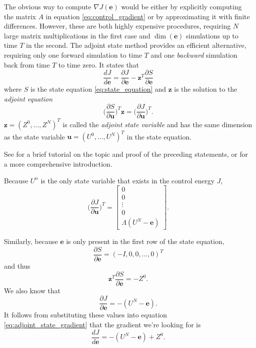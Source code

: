 \documentclass[utf8,english]{gradu3}
\begin{document}
The obvious way to compute $\nabla J(\mathbf{e})$ would be either by
explicitly computing the matrix $A$ in equation \eqref{eq:control_gradient}
or by approximating it with finite differences.
However, these are both highly expensive procedures,
requiring $N$ large matrix multiplications in the first case
and $\dim(\mathbf{e})$ simulations up to time $T$ in the second.
The adjoint state method provides an efficient alternative,
requiring only one forward simulation to time $T$
and one \textit{backward} simulation back from time $T$ to time zero.
It states that
\begin{equation}\label{eq:adjoint_state_gradient}
  \frac{dJ}{d\mathbf{e}}
  = \frac{\partial J}{\partial \mathbf{e}}
  - \mathbf{z}^T \frac{\partial S}{\partial \mathbf{e}}
\end{equation}
where $S$ is the state equation \eqref{eq:state_equation}
and $\mathbf{z}$ is the solution to the \textit{adjoint equation}
\begin{equation}\label{eq:adjoint_equation}
  \Big(\frac{\partial S}{\partial \mathbf{u}}\Big)^T \mathbf{z}
  = \Big(\frac{\partial J}{\partial \mathbf{u}}\Big)^T.
\end{equation}
$\mathbf{z} = (Z^0, \dots, Z^N)^T$ is called the \textit{adjoint state variable}
and has the same dimension as the state variable
$\mathbf{u} = (U^0, \dots, U^N)^T$ in the state equation.

See \parencite{bradley_pde-constrained_2019} for a brief tutorial on the topic
and proof of the preceding statements, or \parencite{givoli_tutorial_2021}
for a more comprehensive introduction.

Because $U^n$ is the only state variable that exists in the control energy $J$,
\[
  \Big(\frac{\partial J}{\partial \mathbf{u}}\Big)^T = \begin{bmatrix}
    0 \\ 0 \\ \vdots \\ 0 \\ \Lambda(U^N - \mathbf{e})
  \end{bmatrix}.
\]

Similarly, because $\mathbf{e}$ is only present in the first row
of the state equation,
\[
  \frac{\partial S}{\partial \mathbf{e}} = (-I, 0, 0, \dots, 0)^T
\]
and thus 
\[
  \mathbf{z}^T \frac{\partial S}{\partial \mathbf{e}} = -Z^0.
\]
We also know that
\[
  \frac{\partial J}{\partial \mathbf{e}} = -(U^N - \mathbf{e}).
\]
It follows from substituting these values into equation \eqref{eq:adjoint_state_gradient}
that the gradient we're looking for is
\begin{equation}\label{eq:adjoint_solution}
  \frac{dJ}{d\mathbf{e}} = -(U^N - \mathbf{e}) + Z^0.
\end{equation}
\end{document}
